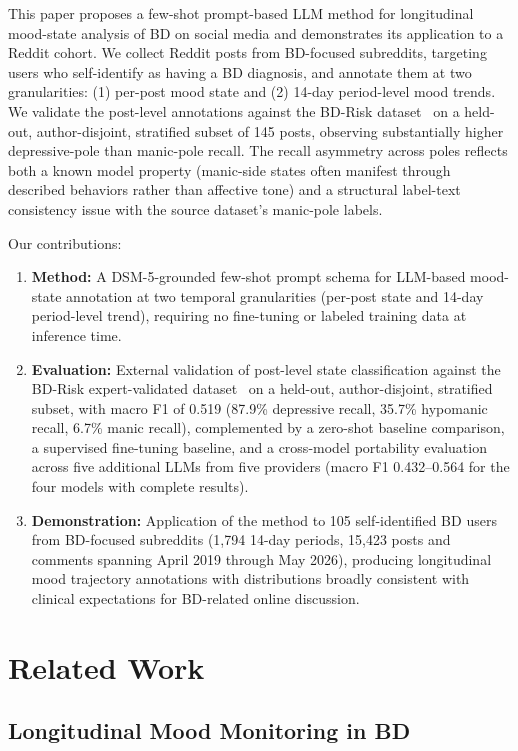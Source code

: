 \documentclass[runningheads]{llncs}
\begin{document}
This paper proposes a few-shot prompt-based LLM method for longitudinal mood-state analysis of BD on social media and demonstrates its application to a Reddit cohort. We collect Reddit posts from BD-focused subreddits, targeting users who self-identify as having a BD diagnosis, and annotate them at two granularities: (1) per-post mood state and (2) 14-day period-level mood trends. We validate the post-level annotations against the BD-Risk dataset~\cite{lee2024detecting} on a held-out, author-disjoint, stratified subset of 145 posts, observing substantially higher depressive-pole than manic-pole recall. The recall asymmetry across poles reflects both a known model property (manic-side states often manifest through described behaviors rather than affective tone) and a structural label-text consistency issue with the source dataset's manic-pole labels.

Our contributions:
\begin{enumerate}
\item \textbf{Method:} A DSM-5-grounded few-shot prompt schema for LLM-based mood-state annotation at two temporal granularities (per-post state and 14-day period-level trend), requiring no fine-tuning or labeled training data at inference time.
\item \textbf{Evaluation:} External validation of post-level state classification against the BD-Risk  expert-validated dataset~\cite{lee2024detecting} on a held-out, author-disjoint, stratified subset, with macro F1 of 0.519 (87.9\% depressive recall, 35.7\% hypomanic recall, 6.7\% manic recall), complemented by a zero-shot baseline comparison, a supervised fine-tuning baseline, and a cross-model portability evaluation across five additional LLMs from five providers (macro F1 0.432--0.564 for the four models with complete results).
\item \textbf{Demonstration:} Application of the method to 105 self-identified BD users from BD-focused subreddits (1,794 14-day periods, 15,423 posts and comments spanning April 2019 through May 2026), producing longitudinal mood trajectory annotations with distributions broadly consistent with clinical expectations for BD-related online discussion.
\end{enumerate}

\section{Related Work}

\subsection{Longitudinal Mood Monitoring in BD}
\end{document}

